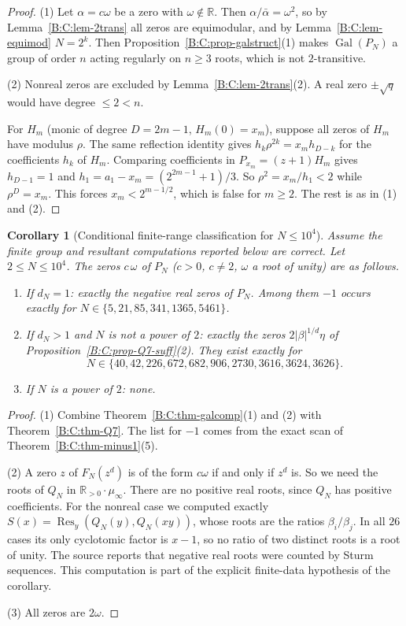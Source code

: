 \documentclass[11pt,a4paper]{article}
\newtheorem{corollary}[theorem]{Corollary}
\theoremstyle{definition}
\theoremstyle{remark}
\numberwithin{equation}{section}
\begin{document}
\begin{proof}
(1) Let $\alpha=c\omega$ be a zero with $\omega\notin\mathbb R$.  Then
$\alpha/\bar\alpha=\omega^2$, so by Lemma~\ref{B:C:lem-2trans} all zeros are
equimodular, and by Lemma~\ref{B:C:lem-equimod} $N=2^k$.  Then
Proposition~\ref{B:C:prop-galstruct}(1) makes $\operatorname{Gal}(P_N)$ a group of
order $n$ acting regularly on $n\ge3$ roots, which is not $2$-transitive.

(2) Nonreal zeros are excluded by Lemma~\ref{B:C:lem-2trans}(2).  A real zero
$\pm\sqrt q$ would have degree $\le2<n$.

For $H_m$ (monic of degree $D=2m-1$, $H_m(0)=x_m$), suppose all zeros of $H_m$
have modulus $\rho$.  The same reflection identity gives
$h_k\rho^{2k}=x_mh_{D-k}$ for the coefficients $h_k$ of $H_m$.  Comparing
coefficients in $P_{x_m}=(z+1)H_m$ gives $h_{D-1}=1$ and
$h_1=a_1-x_m=(2^{2m-1}+1)/3$.  So $\rho^2=x_m/h_1<2$ while $\rho^D=x_m$.  This
forces $x_m<2^{m-1/2}$, which is false for $m\ge2$.  The rest is as in (1) and (2).
\end{proof}

\begin{corollary}[Conditional finite-range classification for $N\le10^4$]\label{B:C:cor-Q7-small}
Assume the finite group and resultant computations reported below are
correct. Let $2\le N\le10^4$. The zeros $c\,\omega$ of $P_N$ ($c>0$, $c\ne2$, $\omega$ a
root of unity) are as follows.
\begin{enumerate}
\item If $d_N=1$: exactly the negative real zeros of $P_N$.  Among them $-1$
occurs exactly for $N\in\{5,21,85,341,1365,5461\}$.
\item If $d_N>1$ and $N$ is not a power of $2$: exactly the zeros
$2|\beta|^{1/d}\eta$ of Proposition~\ref{B:C:prop-Q7-suff}(2).  They exist exactly
for
\[
N\in\{40,42,226,672,682,906,2730,3616,3624,3626\}.
\]
\item If $N$ is a power of $2$: none.
\end{enumerate}
\end{corollary}

\begin{proof}
(1) Combine Theorem~\ref{B:C:thm-galcomp}(1) and (2) with Theorem~\ref{B:C:thm-Q7}.
The list for $-1$ comes from the exact scan of Theorem~\ref{B:C:thm-minus1}(5).

(2) A zero $z$ of $F_N(z^d)$ is of the form $c\omega$ if and only if $z^d$ is.
So we need the roots of $Q_N$ in $\mathbb R_{>0}\cdot\mu_\infty$.  There are no
positive real roots, since $Q_N$ has positive coefficients.  For the nonreal
case we computed exactly $S(x)=\operatorname{Res}_y(Q_N(y),Q_N(xy))$, whose roots
are the ratios $\beta_i/\beta_j$.  In all $26$ cases its only cyclotomic factor
is $x-1$, so no ratio of two distinct roots is a root of unity.  The source reports that negative real roots were counted by Sturm sequences.
This computation is part of the explicit finite-data hypothesis of the corollary.

(3) All zeros are $2\omega$.
\end{proof}
\end{document}
